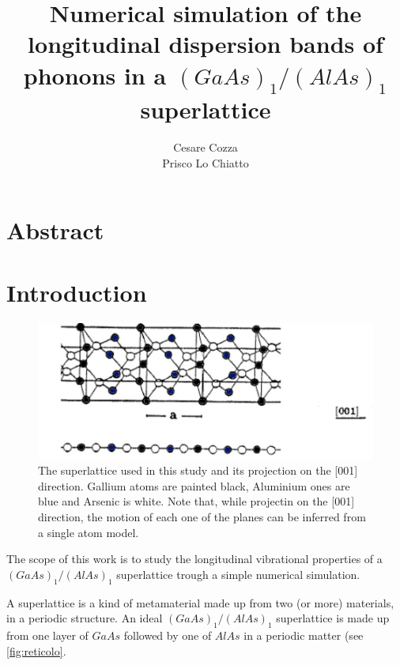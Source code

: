 \documentclass{article}
\begin{document}
 
	
	\author{Cesare Cozza \\ Prisco Lo Chiatto }
	\title{Numerical simulation of the longitudinal dispersion bands of phonons in a $(GaAs)_1/(AlAs)_1$ superlattice}
	\maketitle
    \newpage
    
    
\section{Abstract}




\section{Introduction}
\begin{figure}
	\centering
	\includegraphics[scale=0.3]{reticolo.jpg}
	\caption{The superlattice used in this study and its projection on the [001] direction. Gallium atoms are painted black, Aluminium ones are blue and Arsenic is white. Note that, while projectin on the [001] direction, the motion of each one of the planes can be inferred from a single atom model.}
	\label{fig:reticolo}
\end{figure}
The scope of this work is to study the longitudinal vibrational properties of a $(GaAs)_1/(AlAs)_1$ superlattice trough a simple numerical simulation.\medskip

A superlattice is a kind of metamaterial made up from two (or more) materials, in a periodic structure. An ideal $(GaAs)_1/(AlAs)_1$ superlattice is made up from one layer of $GaAs$ followed by one of $AlAs$ in a periodic matter (see \autoref{fig:reticolo}.\smallskip
\end{document}
